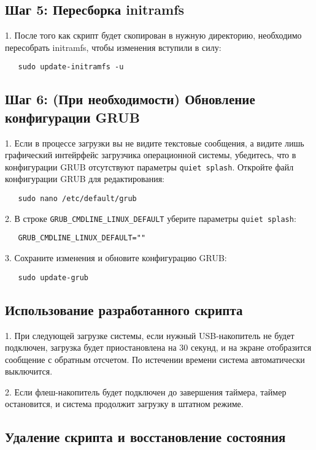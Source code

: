 \documentclass[12pt]{article}
\begin{document}
\subsection*{Шаг 5: Пересборка initramfs}

1. После того как скрипт будет скопирован в нужную директорию, необходимо пересобрать initramfs, чтобы изменения вступили в силу:
   \begin{verbatim}
   sudo update-initramfs -u
   \end{verbatim}

\subsection*{Шаг 6: (При необходимости) Обновление конфигурации GRUB}

1. Если в процессе загрузки  вы не видите текстовые сообщения, а видите лишь графический интейрфейс загрузчика операционной системы, убедитесь, что в конфигурации GRUB отсутствуют параметры \texttt{quiet splash}. Откройте файл конфигурации GRUB для редактирования:
   \begin{verbatim}
   sudo nano /etc/default/grub
   \end{verbatim}

2. В строке \texttt{GRUB\_CMDLINE\_LINUX\_DEFAULT} уберите параметры \texttt{quiet splash}:
   \begin{verbatim}
   GRUB_CMDLINE_LINUX_DEFAULT=""
   \end{verbatim}

3. Сохраните изменения и обновите конфигурацию GRUB:
   \begin{verbatim}
   sudo update-grub
   \end{verbatim}

\subsection*{Использование разработанного скрипта}

1. При следующей загрузке системы, если нужный USB-накопитель не будет подключен, загрузка будет приостановлена на 30 секунд, и на экране отобразится сообщение с обратным отсчетом. По истечении времени система автоматически выключится.

2. Если флеш-накопитель будет подключен до завершения таймера, таймер остановится, и система продолжит загрузку в штатном режиме.

\subsection*{Удаление скрипта и восстановление состояния}
\end{document}
